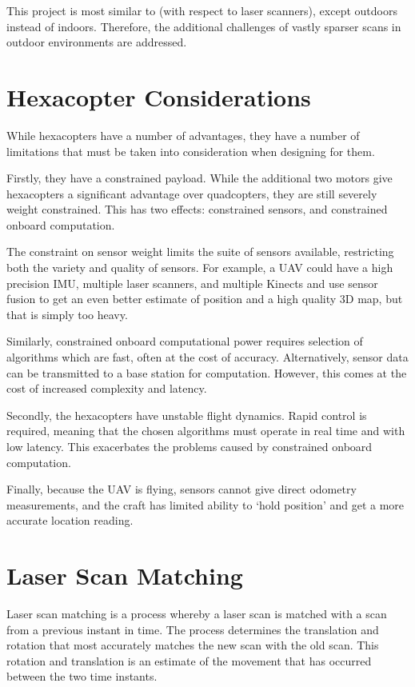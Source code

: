 \documentclass[12pt,oneside,a4paper]{book}
\begin{document}
This project is most similar to \cite{achtelik2009stereo} (with
respect to laser scanners), except outdoors instead of
indoors. Therefore, the additional challenges of vastly sparser scans
in outdoor environments are addressed.

\section{Hexacopter Considerations}
\label{sec:hexac-cons}

While hexacopters have a number of advantages, they have a number of
limitations that must be taken into consideration when designing for them.

Firstly, they have a constrained payload. While the additional two
motors give hexacopters a significant advantage over quadcopters, they
are still severely weight constrained. This has two effects:
constrained sensors, and constrained onboard computation.

The constraint on sensor weight limits the suite of sensors available,
restricting both the variety and quality of sensors. For example, a
UAV could have a high precision \gls{IMU}, multiple laser scanners,
and multiple Kinects and use sensor fusion to get an even better
estimate of position and a high quality 3D map, but that is simply too
heavy.

Similarly, constrained onboard computational power requires selection
of algorithms which are fast, often at the cost of accuracy.
Alternatively, sensor data can be transmitted to a base station for
computation. However, this comes at the cost of increased complexity
and latency.

Secondly, the hexacopters have unstable flight dynamics. Rapid control
is required, meaning that the chosen algorithms must operate in real
time and with low latency. This exacerbates the problems caused by
constrained onboard computation.

Finally, because the UAV is flying, sensors cannot give direct
odometry measurements, and the craft has limited ability to `hold
position' and get a more accurate location reading.


\section{Laser Scan Matching}
\label{sec:laser-scan-matching-1}

Laser scan matching is a process whereby a laser scan is matched with
a scan from a previous instant in time. The process determines the
translation and rotation that most accurately matches the new scan
with the old scan. This rotation and translation is an estimate of the
movement that has occurred between the two time instants.
\end{document}
